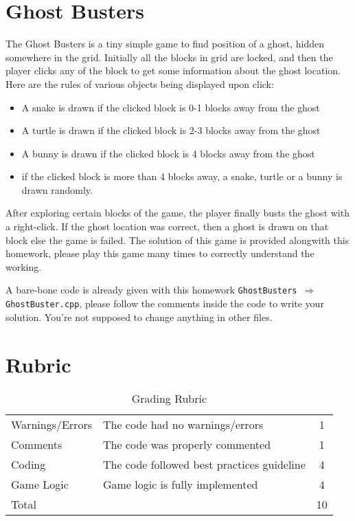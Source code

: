 \documentclass[a4paper,12pt]{article}
\begin{document}
	\newpage
	
	\section{Ghost Busters}
	
	The Ghost Busters is a tiny simple game to find position of a ghost, hidden somewhere in the grid. Initially all the blocks in grid are locked, and then the player clicks any of the block to get some information about the ghost location. Here are the rules of various objects being displayed upon click:

	\begin{itemize}
		\item A snake is drawn if the clicked block is 0-1 blocks away from the ghost
		\item A turtle is drawn if the clicked block is 2-3 blocks away from the ghost
		\item A bunny is drawn if the clicked block is 4 blocks away from the ghost
		\item if the clicked block is more than 4 blocks away, a snake, turtle or a bunny is drawn randomly.
	\end{itemize}

After exploring certain blocks of the game, the player finally busts the ghost with a right-click. If the ghost location was correct, then a ghost is drawn on that block else the game is failed.  The solution of this game is provided alongwith this homework, please play this game many times to correctly understand the working. 

A bare-bone code is already given with this homework \texttt{GhostBusters $\Rightarrow$ GhostBuster.cpp}, please follow the comments inside the code to write your solution. You're not supposed to change anything in other files.


	\section{Rubric}
	\begin{table}[h]
	    \centering
	    \begin{tabular}{llc}
	    \toprule
            Warnings/Errors	& The code had no warnings/errors	& 1 \\
            Comments &	The code was properly commented	& 1 \\
            Coding	& The code followed best practices guideline &	4 \\
            Game Logic	& Game logic is fully implemented	& 4 \\
            \midrule
            Total & & 10\\
            \bottomrule
	    \end{tabular}
	    \caption{Grading Rubric}
	    \label{Grading}
	\end{table}
\end{document}
